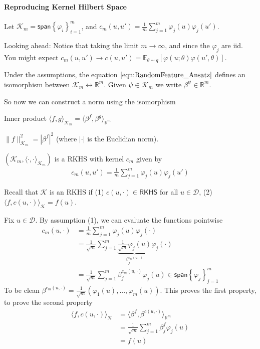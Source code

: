 \documentclass[11pt,fleqn]{article}
\numberwithin{equation}{section}
\theoremstyle{definition}
\theoremstyle{definition}
\renewenvironment{proof}[1][\proofname]{\vspace{-10pt}\begin{replacementproof}}{\end{replacementproof}}
\begin{document}
\paragraph{Reproducing Kernel Hilbert Space}
Let $\mathcal K_m = \textsf{span} \left\{ \varphi_i \right\}_{i=1}^m$, and $c_m(u, u') = \frac{1}{m} \sum_{j=1}^m \varphi_j(u) \varphi_j(u')$. 
\begin{sidework}
	Looking ahead: Notice that taking the limit $m \to \infty$, and since the $\varphi_j$ are iid. You might expect $ c_m(u,u') \to c(u,u') = \mathbb E_{\theta \sim q}[\varphi(u; \theta) \varphi(u', \theta)]$.
\end{sidework}
\begin{remark}
	Under the assumptions, the equation $\ref{eqn:RandomFeature_Ansatz}$ defines an isomorphism between $\mathcal K_m \leftrightarrow \mathbb R^m$. Given $\psi \in \mathcal K_m$ we write $\beta^\psi \in \mathbb R^m$.
\end{remark}
So now we can construct a norm using the isomorphism
\begin{definition}
	Inner product $\langle f, g \rangle_{\mathcal K_m} = \langle \beta^f, \beta^g\rangle_{\mathbb R^m}$
\end{definition}
\begin{remark}
	$\|f\|_{\mathcal K_m}^2 = |\beta^f|^2$ (where $|\cdot|$ is the Euclidian norm).
\end{remark}
\begin{theorem}
	$(\mathcal K_m, \langle \cdot, \cdot \rangle_{\mathcal K_m})$ is a RKHS with kernel $c_m$ given by
	\begin{align}
		c_m(u,u') = \frac{1}{m} \sum_{j=1}^m \varphi_j(u) \varphi_j(u')
	\end{align}
\end{theorem}
Recall that $\mathcal K$ is an RKHS if (1) $c(u, \cdot) \in \textsf{RKHS}$ for all $u \in \mathcal D$, (2) $\langle f, c(u, \cdot) \rangle_{\mathcal K} = f(u)$.
\begin{proof}
	Fix $u \in \mathcal D$. By assumption (1), we can evaluate the functions pointwise
	\begin{align}
		c_m(u, \cdot) & = \frac{1}{m} \sum_{j=1}^m \varphi_j(u) \varphi_j(\cdot )\\
		& = \frac{1}{\sqrt{m}} \sum_{j=1}^m \underbrace{\frac{1}{\sqrt{m}} \varphi_j(u)}_{\beta_j^{c_m(u, \cdot)}} \varphi_j(\cdot)\\
		& = \frac{1}{\sqrt{m}} \sum_{j=1}^m \beta_j^{c_m(u, \cdot)} \varphi_j(u) \in \textsf{span}\left\{ \varphi_j \right\}_{j=1}^m
	\end{align}
	To be clean $\beta^{c_m(u, \cdot)} = \frac{1}{\sqrt{m}} (\varphi_1(u), ..., \varphi_m(u))$. This proves the first property, to prove the second property
	\begin{align}
		\langle f, c(u, \cdot) \rangle_{\mathcal K}& = \langle \beta^f, \beta^{c(u, \cdot)} \rangle_{\mathbb R^m}\\
		& = \frac{1}{\sqrt{m}} \sum_{j=1}^m \beta_j^f \varphi_j(u)\\
		& = f(u)
	\end{align}
\end{proof}
\end{document}
